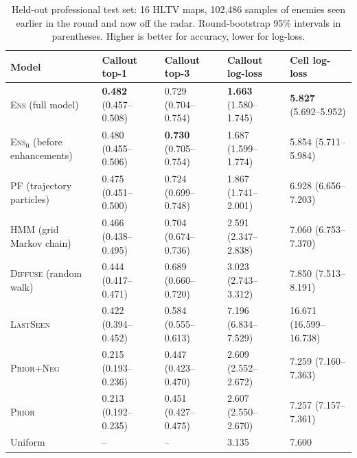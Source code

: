 \documentclass[11pt]{article}
\newcommand{\model}[1]{\textsc{#1}}
\newcommand{\ci}[2]{{\scriptsize(#1--#2)}}
\newcommand{\1}{\mathbb{1}}
\begin{document}
\begin{table}[t]
\centering
\caption{Held-out professional test set: 16 HLTV maps, 102{,}486 samples of enemies seen earlier in the round and now off the radar. Round-bootstrap 95\% intervals in parentheses. Higher is better for accuracy, lower for log-loss.}
\label{tab:main}
\small
\setlength{\tabcolsep}{5pt}
\begin{tabular}{@{}lllll@{}}
\toprule
Model & Callout top-1 & Callout top-3 & Callout log-loss & Cell log-loss \\
\midrule
\model{Ens} (full model) & \textbf{0.482} \ci{0.457}{0.508} & 0.729 \ci{0.704}{0.754} & \textbf{1.663} \ci{1.580}{1.745} & \textbf{5.827} \ci{5.692}{5.952} \\
\model{Ens$_0$} (before enhancements) & 0.480 \ci{0.455}{0.506} & \textbf{0.730} \ci{0.705}{0.754} & 1.687 \ci{1.599}{1.774} & 5.854 \ci{5.711}{5.984} \\
\model{PF} (trajectory particles) & 0.475 \ci{0.451}{0.500} & 0.724 \ci{0.699}{0.748} & 1.867 \ci{1.741}{2.001} & 6.928 \ci{6.656}{7.203} \\
\model{HMM} (grid Markov chain) & 0.466 \ci{0.438}{0.495} & 0.704 \ci{0.674}{0.736} & 2.591 \ci{2.347}{2.838} & 7.060 \ci{6.753}{7.370} \\
\model{Diffuse} (random walk) & 0.444 \ci{0.417}{0.471} & 0.689 \ci{0.660}{0.720} & 3.023 \ci{2.743}{3.312} & 7.850 \ci{7.513}{8.191} \\
\model{LastSeen} & 0.422 \ci{0.394}{0.452} & 0.584 \ci{0.555}{0.613} & 7.196 \ci{6.834}{7.529} & 16.671 \ci{16.599}{16.738} \\
\model{Prior+Neg} & 0.215 \ci{0.193}{0.236} & 0.447 \ci{0.423}{0.470} & 2.609 \ci{2.552}{2.672} & 7.259 \ci{7.160}{7.363} \\
\model{Prior} & 0.213 \ci{0.192}{0.235} & 0.451 \ci{0.427}{0.475} & 2.607 \ci{2.550}{2.670} & 7.257 \ci{7.157}{7.361} \\
Uniform & -- & -- & 3.135 & 7.600 \\
\bottomrule
\end{tabular}
\end{table}
\end{document}
